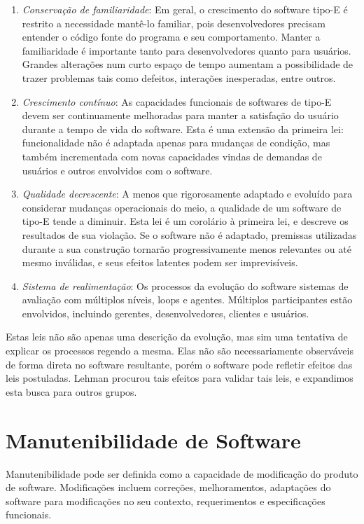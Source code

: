 \begin{enumerate}
	\item \textit{Conservação de familiaridade}: Em geral, o crescimento do software tipo-E é restrito a necessidade mantê-lo familiar, pois desenvolvedores precisam entender o código fonte do programa e seu comportamento. Manter a familiaridade é importante tanto para desenvolvedores quanto para usuários. Grandes alterações num curto espaço de tempo aumentam a possibilidade de trazer problemas tais como defeitos, interações inesperadas, entre outros.
	\item \textit{Crescimento contínuo}: As capacidades funcionais de softwares de tipo-E devem ser continuamente melhoradas para manter a satisfação do usuário durante a tempo de vida do software. Esta é uma extensão da primeira lei: funcionalidade não é adaptada apenas para mudanças de condição, mas também incrementada com novas capacidades vindas de demandas de usuários e outros envolvidos com o software.
	\item \textit{Qualidade decrescente}: A menos que rigorosamente adaptado e evoluído para considerar mudanças operacionais do meio, a qualidade de um software de tipo-E tende a diminuir. Esta lei é um corolário à primeira lei, e descreve os resultados de sua violação. Se o software não é adaptado, premissas utilizadas durante a sua construção tornarão progressivamente menos relevantes ou até mesmo inválidas, e seus efeitos latentes podem ser imprevisíveis.
	\item \textit{Sistema de realimentação}: Os processos da evolução do software sistemas de avaliação com múltiplos níveis, loops e agentes. Múltiplos participantes estão envolvidos, incluindo gerentes, desenvolvedores, clientes e usuários. 
\end{enumerate}

Estas leis não são apenas uma descrição da evolução, mas sim uma tentativa de explicar os processos regendo a mesma. Elas não são necessariamente observáveis de forma direta no software resultante, porém o software pode refletir efeitos das leis postuladas. Lehman procurou tais efeitos para validar tais leis, e expandimos esta busca para outros grupos.

\section{Manutenibilidade de Software} \label{sec:maintainability}
Manutenibilidade pode ser definida como a capacidade de modificação
do produto de software. Modificações incluem correções, melhoramentos,
adaptações do software para modificações no seu contexto, requerimentos
e especificações funcionais\cite{van1993software}.

